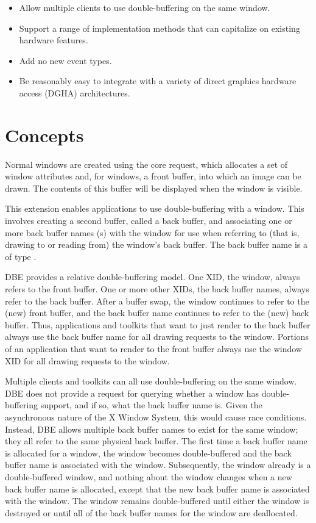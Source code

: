 \begin{itemize}

\item Allow multiple clients to use double-buffering on the same window.

\item Support a range of implementation methods that can capitalize on
existing hardware features.

\item Add no new event types.

\item Be reasonably easy to integrate with a variety of direct graphics
hardware access (DGHA) architectures.
\end{itemize}

\section{Concepts}

Normal windows are created using the core 
request, which allocates a set of window attributes and, for
 windows, a front buffer,
into which an image can be drawn.
The contents of this buffer will be displayed when the window is
visible.

This extension enables applications to use double-buffering with a
window.  This involves creating a second buffer, called a back buffer,
and associating one or more back buffer names (s) with
the window for use when referring to (that is, drawing to or reading
from) the window's back buffer.  The back buffer name is a
 of type .

DBE provides a relative double-buffering model.  One XID, the window,
always refers to the front buffer.  One or more other XIDs, the back buffer
names, always refer to the back buffer.  After a buffer swap, the
window continues to refer to the (new) front buffer, and the
back buffer name continues to refer to the (new) back buffer.  Thus,
applications and toolkits that want to just render to the back buffer
always use the back buffer name for all drawing requests to the
window.  Portions of an application that want to render to the front
buffer always use the window XID for all drawing requests to the
window.

Multiple clients and toolkits can all use double-buffering on the same
window.  DBE does not provide a request for querying whether a window
has double-buffering support, and if so, what the back buffer name is.
Given the asynchronous nature of the X Window System, this would cause
race conditions.  Instead, DBE allows multiple back buffer names to
exist for the same window; they all refer to the same physical back
buffer.  The first time a back buffer name is allocated for a window,
the window becomes double-buffered and the back buffer name is
associated with the window.  Subsequently, the window already is a
double-buffered window, and nothing about the window changes when a
new back buffer name is allocated, except that the new back buffer
name is associated with the window.  The window remains
double-buffered until either the window is destroyed or until all of
the back buffer names for the window are deallocated.

